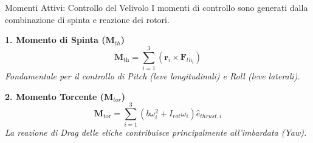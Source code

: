 \documentclass[aspectratio=169]{beamer} %
\begin{document}
\begin{frame}{Momenti Attivi: Controllo del Velivolo}
    I momenti di controllo sono generati dalla combinazione di spinta e reazione dei rotori.
    
    \vspace{0.3cm}
    \textbf{1. Momento di Spinta ($\bm{M}_{th}$)}
    \begin{equation}
        \bm{M}_{\text{th}} = \sum_{i=1}^{3} (\bm{r}_i \times \bm{F}_{th_{i}})
    \end{equation}
    \small \textit{Fondamentale per il controllo di Pitch (leve longitudinali) e Roll (leve laterali).}
    
    \vspace{0.4cm}
    \textbf{2. Momento Torcente ($\bm{M}_{tor}$)}
    \begin{equation}
        \bm{M}_{\text{tor}} = \sum_{i=1}^{3} (b \omega_i^2 + I_{rot} \dot{\omega}_i) \hat{e}_{thrust,i}
    \end{equation}
    \small \textit{La reazione di Drag delle eliche contribuisce principalmente all'imbardata (Yaw).}
\end{frame}
\end{document}
